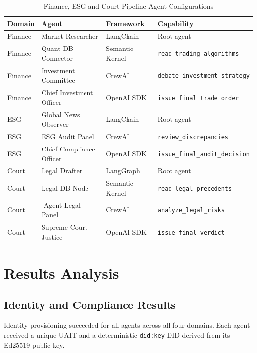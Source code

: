 \begin{table}[H]
\centering
\caption{Finance, ESG and Court Pipeline Agent Configurations}
\label{tab:other_configs}
\renewcommand{\arraystretch}{1.1}\small
\begin{tabularx}{\textwidth}{|l|>{\raggedright\arraybackslash}p{3.6cm}|l|>{\raggedright\arraybackslash}X|}
\hline
\textbf{Domain} & \textbf{Agent} & \textbf{Framework} & \textbf{Capability} \\
\hline
Finance & Market Researcher & LangChain & Root agent \\
Finance & Quant DB Connector & Semantic Kernel & \texttt{read\_trading\_\allowbreak algorithms} \\
Finance & Investment Committee & CrewAI & \texttt{debate\_investment\_\allowbreak strategy} \\
Finance & Chief Investment Officer & OpenAI SDK & \texttt{issue\_final\_\allowbreak trade\_order} \\
\hline
ESG & Global News Observer & LangChain & Root agent \\
ESG & ESG Audit Panel & CrewAI & \texttt{review\_discrepancies} \\
ESG & Chief Compliance Officer & OpenAI SDK & \texttt{issue\_final\_\allowbreak audit\_decision} \\
\hline
Court & Legal Drafter & LangGraph & Root agent \\
Court & Legal DB Node & Semantic Kernel & \texttt{read\_legal\_\allowbreak precedents} \\
Court & 5-Agent Legal Panel & CrewAI & \texttt{analyze\_legal\_risks} \\
Court & Supreme Court Justice & OpenAI SDK & \texttt{issue\_final\_verdict} \\
\hline
\end{tabularx}\normalsize
\end{table}

\section{Results Analysis}

\subsection{Identity and Compliance Results}

Identity provisioning succeeded for all agents across all four domains. Each agent received a unique UAIT and a deterministic \texttt{did:key} DID derived from its Ed25519 public key.

